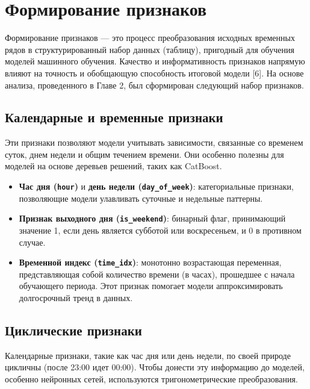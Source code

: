 \section{Формирование признаков}
\label{sec:feature_engineering}

\hspace*{1.25cm}Формирование признаков --- это процесс преобразования исходных временных рядов в структурированный набор данных (таблицу), пригодный для обучения моделей машинного обучения. Качество и информативность признаков напрямую влияют на точность и обобщающую способность итоговой модели [6]. На основе анализа, проведенного в Главе 2, был сформирован следующий набор признаков.

\subsection{Календарные и временные признаки}

\hspace*{1.25cm}Эти признаки позволяют модели учитывать зависимости, связанные со временем суток, днем недели и общим течением времени. Они особенно полезны для моделей на основе деревьев решений, таких как CatBoost.

\begin{itemize}
	\item \textbf{Час дня (\texttt{hour})} и \textbf{день недели (\texttt{day\_of\_week})}: категориальные признаки, позволяющие модели улавливать суточные и недельные паттерны.
	\item \textbf{Признак выходного дня (\texttt{is\_weekend})}: бинарный флаг, принимающий значение 1, если день является субботой или воскресеньем, и 0 в противном случае.
	\item \textbf{Временной индекс (\texttt{time\_idx})}: монотонно возрастающая переменная, представляющая собой количество времени (в часах), прошедшее с начала обучающего периода. Этот признак помогает модели аппроксимировать долгосрочный тренд в данных.
\end{itemize}

\subsection{Циклические признаки}

\hspace*{1.25cm}Календарные признаки, такие как час дня или день недели, по своей природе цикличны (после 23:00 идет 00:00). Чтобы донести эту информацию до моделей, особенно нейронных сетей, используются тригонометрические преобразования.

